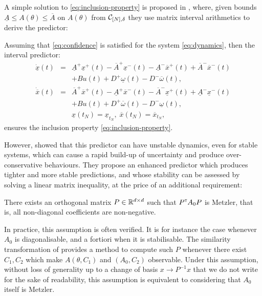 \documentclass{article}
\begin{document}
A simple solution to \eqref{eq:inclusion-property} is proposed in \citep{efimov:hal-00701643}, where, given bounds $\underline{A}\leq A(\theta)\leq\overline{A}$ on $A(\theta)$ from $\mathcal{C}_{[N],\delta}$ they use matrix interval arithmetics to derive the predictor:
\begin{proposition}
Assuming that \eqref{eq:confidence} is satisfied for the system \eqref{eq:dynamics}, then the interval predictor:
\begin{eqnarray}
\dot{\underline{x}}(t) & = & \underline{A}^{+}\underline{x}^{+}(t)-\overline{A}^{+}\underline{x}^{-}(t)-\underline{A}^{-}\overline{x}^{+}(t) +\overline{A}^{-}\overline{x}^{-}(t)\nonumber \\
 &  &+Bu(t) + D^{+}\underline{\omega}(t)-D^{-}\overline{\omega}(t),\label{eq:predictor-naive}\\
\dot{\overline{x}}(t) & = & \overline{A}^{+}\overline{x}^{+}(t)-\underline{A}^{+}\overline{x}^{-}(t)-\overline{A}^{-}\underline{x}^{+}(t)+\underline{A}^{-}\underline{x}^{-}(t)\nonumber \\
 &  &+Bu(t) + D^{+}\overline{\omega}(t)-D^{-}\underline{\omega}(t),\nonumber \\
 &  & \underline{x}(t_N)=\underline{x}_{t_N},\;\overline{x}(t_N)=\overline{x}_{t_N},\nonumber 
\end{eqnarray}
ensures the inclusion property \eqref{eq:inclusion-property}.
\end{proposition}

However, \citet{leurent2019interval} showed that this predictor can have unstable dynamics, even for stable systems, which can cause a rapid build-up of uncertainty and produce over-conservative behaviours. They propose an enhanced predictor which produces tighter and more stable predictions, and whose stability can be assessed by solving a linear matrix inequality, at the price of an additional requirement:

\begin{assumption}
\label{assumpt:metzler}
There exists an orthogonal matrix $P\in\mathbb{R}^{d\times d}$ such that $P^{\mathsf{\scriptscriptstyle T}} A_0 P$ is Metzler, that is, all non-diagonal coefficients are non-negative.
\end{assumption}
In practice, this assumption is often verified. It is for instance the case whenever $A_0$ is diagonalisable, and a fortiori when it is stabilisable. The similarity transformation of \citep{Efimov_a2013} provides a method to compute such $P$ whenever there exist $C_1,C_2$ which make $A(\theta, C_1)$ and $(A_0, C_2)$ observable.
Under this assumption, without loss of generality up to a change of basis $x\rightarrow P^{-1}x$ that we do not write for the sake of readability, this assumption is equivalent to considering that $A_0$ itself is Metzler.
\end{document}
